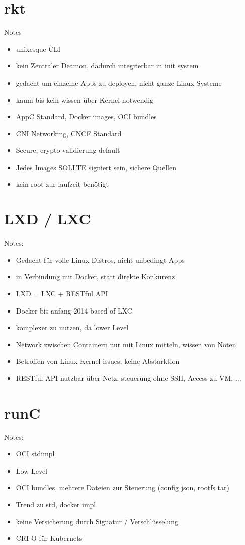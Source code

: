 \section{rkt}
\label{sec:compRkt}
Notes
\begin{itemize}
	\item unixesque CLI
	\item kein Zentraler Deamon, dadurch integrierbar in init system
	\item gedacht um einzelne Apps zu deployen, nicht ganze Linux Systeme
	\item kaum bis kein wissen über Kernel notwendig
	\item AppC Standard, Docker images, OCI bundles
	\item CNI Networking, CNCF Standard
	\item Secure, crypto validierung default
	\item Jedes Images SOLLTE signiert sein, sichere Quellen
	\item kein root zur laufzeit benötigt
\end{itemize}

\section{LXD / LXC}
\label{sec:compLXD}
Notes:
\begin{itemize}
	\item Gedacht für volle Linux Distros, nicht unbedingt Apps
	\item in Verbindung mit Docker, statt direkte Konkurenz
	\item LXD = LXC + RESTful API
	\item Docker bis anfang 2014 based of LXC
	\item komplexer zu nutzen, da lower Level
	\item Network zwischen Containern nur mit Linux mitteln, wissen von Nöten
	\item Betroffen von Linux-Kernel issues, keine Abstarktion
	\item RESTful API nutzbar über Netz, steuerung ohne SSH, Access zu VM, ...
\end{itemize}

\section{runC}
\label{sec:compRunc}

Notes:
\begin{itemize}
	\item OCI stdimpl
	\item Low Level
	\item OCI bundles, mehrere Dateien zur Steuerung (config json, rootfs tar)
	\item Trend zu std, docker impl
	\item keine Versicherung durch Signatur / Verschlüsselung
	\item CRI-O für Kubernets
\end{itemize}

